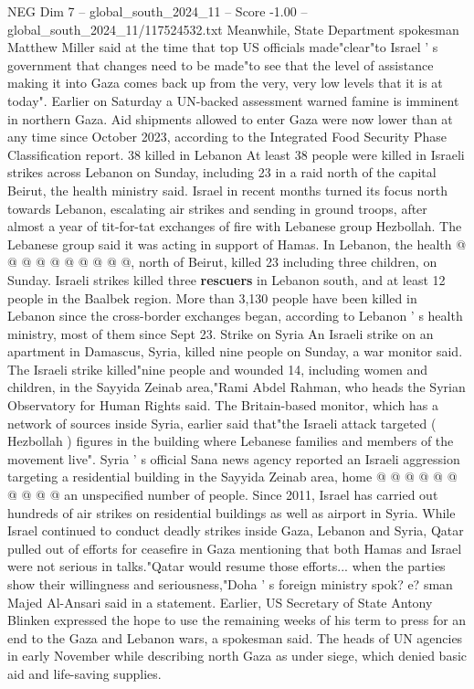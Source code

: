 \begin{textsample}{NEG Dim 7 – global\_south\_2024\_11 – Score -1.00 – global\_south\_2024\_11/117524532.txt}  \label{ex:f7_neg_317}
Meanwhile, State Department spokesman Matthew Miller said at the time that top US officials made"clear"to Israel ' s government that changes need to be made"to see that the level of assistance making it into Gaza comes back up from the very, very low levels that it is at today".
Earlier on Saturday a UN-backed assessment warned famine is imminent in northern Gaza.
Aid shipments allowed to enter Gaza were now lower than at any time since October 2023, according to the Integrated Food Security Phase Classification report. 38 killed in Lebanon At least 38 people were killed in Israeli strikes across Lebanon on Sunday, including 23 in a raid north of the capital Beirut, the health ministry said.
Israel in recent months turned its focus north towards Lebanon, escalating air strikes and sending in ground troops, after almost a year of tit-for-tat exchanges of fire with Lebanese group Hezbollah.
The Lebanese group said it was acting in support of Hamas.
In Lebanon, the health @ @ @ @ @ @ @ @ @ @, north of Beirut, killed 23 including three children, on Sunday.
Israeli strikes killed three \textbf{rescuers} in Lebanon south, and at least 12 people in the Baalbek region.
More than 3,130 people have been killed in Lebanon since the cross-border exchanges began, according to Lebanon ' s health ministry, most of them since Sept 23.
Strike on Syria An Israeli strike on an apartment in Damascus, Syria, killed nine people on Sunday, a war monitor said.
The Israeli strike killed"nine people and wounded 14, including women and children, in the Sayyida Zeinab area,"Rami Abdel Rahman, who heads the Syrian Observatory for Human Rights said.
The Britain-based monitor, which has a network of sources inside Syria, earlier said that"the Israeli attack targeted ( Hezbollah ) figures in the building where Lebanese families and members of the movement live".
Syria ' s official Sana news agency reported an Israeli aggression targeting a residential building in the Sayyida Zeinab area, home @ @ @ @ @ @ @ @ @ @ an unspecified number of people.
Since 2011, Israel has carried out hundreds of air strikes on residential buildings as well as airport in Syria.
While Israel continued to conduct deadly strikes inside Gaza, Lebanon and Syria, Qatar pulled out of efforts for ceasefire in Gaza mentioning that both Hamas and Israel were not serious in talks."Qatar would resume those efforts... when the parties show their willingness and seriousness,"Doha ' s foreign ministry spok? e? sman Majed Al-Ansari said in a statement.
Earlier, US Secretary of State Antony Blinken expressed the hope to use the remaining weeks of his term to press for an end to the Gaza and Lebanon wars, a spokesman said.
The heads of UN agencies in early November while describing north Gaza as under siege, which denied basic aid and life-saving supplies.

\end{textsample}
